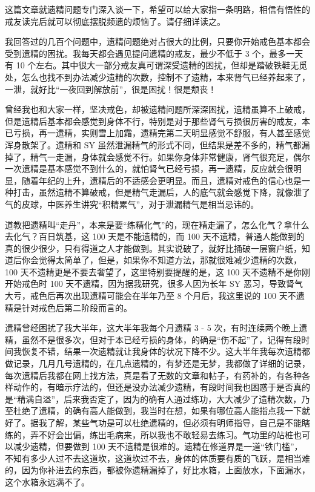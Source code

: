 \documentclass{ctexart}
\begin{document}
这篇文章就遗精问题专门深入谈一下，希望可以给大家指一条明路，相信有悟性的戒友读完后就可以彻底摆脱频遗的烦恼了。请仔细详读之。

我回答过的几百个问题中，遗精问题绝对占很大的比例，只要你开始戒色基本都会受到遗精的困扰。我每天都会遇见提问遗精的戒友，最少不低于 3 个，最多一天有 10 个左右。其中很大一部分戒友真可谓深受遗精的困扰，但却是踏破铁鞋无觅处，怎么也找不到办法减少遗精的次数，控制不了遗精，本来肾气已经养起来了，一泄，就好比“一夜回到解放前”，很是困扰！很是颓丧！

曾经我也和大家一样，坚决戒色，却被遗精问题所深深困扰，遗精虽算不上破戒，但是遗精后基本都会感觉到身体不行，特别是对于那些肾气亏损很厉害的戒友，本已亏损，再一遗精，实则雪上加霜，遗精完第二天明显感觉不舒服，有人甚至感觉浑身散架了。遗精和 SY 虽然泄漏精气的形式不同，但结果是差不多的，精气都漏掉了，精气一走漏，身体就会感觉不行。如果你身体非常健康，肾气很充足，偶尔一次遗精是基本感觉不到什么的，就怕肾气已经亏损，再一遗精，反应就会很明显，随着年纪的上升，遗精后的不适感会更明显。而且，遗精对戒色的信心也是一种打击，虽然遗精不算破戒，但是精气走漏后，人的底气就会感觉下降，就像泄了气的皮球，中医养生讲究“积精累气”，对于泄漏精气是相当忌讳的。

道教把遗精叫“走丹”，本来是要“练精化气”的，现在精走漏了，怎么化气？拿什么去化气？百日筑基，这 100 天是不能遗精的，而 100 天不遗精，普通人能做到的真的很少很少，只有得道之人才能做到。其实说破了，就好比捅破一层窗户纸，知道后你会觉得太简单了，但是，如果你不知道方法，那就很难减少遗精的次数，100 天不遗精更是不要去奢望了，这里特别要提醒的是，这 100 天不遗精不是你刚开始戒色时 100 天不遗精，因为据我研究，很多人因为长年 SY 恶习，导致肾气大亏，戒色后再次出现遗精可能会在半年乃至 8 个月后，我这里说的 100 天不遗精是针对戒色后第二阶段而言的。

遗精曾经困扰了我大半年，这大半年我每个月遗精 3 - 5 次，有时连续两个晚上遗精，虽然不是很多次，但对于本已经亏损的身体，的确是“伤不起”了，记得有段时间我恢复不错，结果一次遗精就让我身体的状况下降不少。这大半年我每次遗精都做记录，几月几号遗精的，在几点遗精的，有梦还是无梦，我都做了详细的记录，每次遗精后我都在网上找方法，真是看了无数的文章和帖子，有药补的，有各种各样动作的，有暗示疗法的，但还是没办法减少遗精，有段时间我也困惑于是否真的是“精满自溢”，后来我否定了，因为的确有人通过练功，大大减少了遗精次数，乃至杜绝了遗精，的确有高人能做到，我当时在想，如果有哪位高人能指点我一下就好了。据我了解，某些气功是可以杜绝遗精的，但必须有明师指导，自己是不能瞎练的，弄不好会出偏，练出毛病来，所以我也不敢轻易去练习。气功里的站桩也可以减少遗精，但要做到 100 天不遗精是很难的。遗精在修道界是一道“铁门槛”，不知有多少人过不去这道坎，这道坎过不去，身体的体质要有质的飞跃，是相当难的，因为你补进去的东西，都被你遗精漏掉了，好比水箱，上面放水，下面漏水，这个水箱永远满不了。
\end{document}
